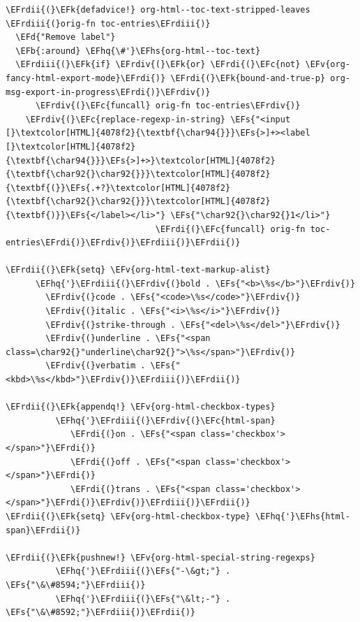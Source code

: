\documentclass{scrartcl}
\newcommand{\EFk}[1]{\textcolor{EFk}{#1}} %
\newcommand{\EFd}[1]{\textcolor{EFd}{\textit{#1}}} %
\newcommand{\EFs}[1]{\textcolor{EFs}{#1}} %
\newcommand{\EFb}[1]{\textcolor{EFb}{#1}} %
\newcommand{\EFc}[1]{\textcolor{EFc}{#1}} %
\newcommand{\EFv}[1]{\textcolor{EFv}{#1}} %
\newcommand{\EFhq}[1]{\textcolor{EFhq}{#1}} %
\newcommand{\EFhs}[1]{\textcolor{EFhs}{#1}} %
\newcommand{\EFrdi}[1]{\textcolor{EFrdi}{#1}} %
\newcommand{\EFrdii}[1]{\textcolor{EFrdii}{#1}} %
\newcommand{\EFrdiii}[1]{\textcolor{EFrdiii}{#1}} %
\newcommand{\EFrdiv}[1]{\textcolor{EFrdiv}{#1}} %
\begin{document}
\begin{Code}
\begin{Verbatim}[]
 \EFrdii{(}\EFk{defadvice!} org-html--toc-text-stripped-leaves \EFrdiii{(}orig-fn toc-entries\EFrdiii{)}
  \EFd{"Remove label"}
  \EFb{:around} \EFhq{\#'}\EFhs{org-html--toc-text}
  \EFrdiii{(}\EFk{if} \EFrdiv{(}\EFk{or} \EFrdi{(}\EFc{not} \EFv{org-fancy-html-export-mode}\EFrdi{)} \EFrdi{(}\EFk{bound-and-true-p} org-msg-export-in-progress\EFrdi{)}\EFrdiv{)}
      \EFrdiv{(}\EFc{funcall} orig-fn toc-entries\EFrdiv{)}
    \EFrdiv{(}\EFc{replace-regexp-in-string} \EFs{"<input [}\textcolor[HTML]{4078f2}{\textbf{\char94{}}}\EFs{>]+><label [}\textcolor[HTML]{4078f2}{\textbf{\char94{}}}\EFs{>]+>}\textcolor[HTML]{4078f2}{\textbf{\char92{}\char92{}}}\textcolor[HTML]{4078f2}{\textbf{(}}\EFs{.+?}\textcolor[HTML]{4078f2}{\textbf{\char92{}\char92{}}}\textcolor[HTML]{4078f2}{\textbf{)}}\EFs{</label></li>"} \EFs{"\char92{}\char92{}1</li>"}
                              \EFrdi{(}\EFc{funcall} orig-fn toc-entries\EFrdi{)}\EFrdiv{)}\EFrdiii{)}\EFrdii{)}

\EFrdii{(}\EFk{setq} \EFv{org-html-text-markup-alist}
      \EFhq{'}\EFrdiii{(}\EFrdiv{(}bold . \EFs{"<b>\%s</b>"}\EFrdiv{)}
        \EFrdiv{(}code . \EFs{"<code>\%s</code>"}\EFrdiv{)}
        \EFrdiv{(}italic . \EFs{"<i>\%s</i>"}\EFrdiv{)}
        \EFrdiv{(}strike-through . \EFs{"<del>\%s</del>"}\EFrdiv{)}
        \EFrdiv{(}underline . \EFs{"<span class=\char92{}"underline\char92{}">\%s</span>"}\EFrdiv{)}
        \EFrdiv{(}verbatim . \EFs{"<kbd>\%s</kbd>"}\EFrdiv{)}\EFrdiii{)}\EFrdii{)}

\EFrdii{(}\EFk{appendq!} \EFv{org-html-checkbox-types}
          \EFhq{'}\EFrdiii{(}\EFrdiv{(}\EFc{html-span}
             \EFrdi{(}on . \EFs{"<span class='checkbox'></span>"}\EFrdi{)}
             \EFrdi{(}off . \EFs{"<span class='checkbox'></span>"}\EFrdi{)}
             \EFrdi{(}trans . \EFs{"<span class='checkbox'></span>"}\EFrdi{)}\EFrdiv{)}\EFrdiii{)}\EFrdii{)}
\EFrdii{(}\EFk{setq} \EFv{org-html-checkbox-type} \EFhq{'}\EFhs{html-span}\EFrdii{)}

\EFrdii{(}\EFk{pushnew!} \EFv{org-html-special-string-regexps}
          \EFhq{'}\EFrdiii{(}\EFs{"-\&gt;"} . \EFs{"\&\#8594;"}\EFrdiii{)}
          \EFhq{'}\EFrdiii{(}\EFs{"\&lt;-"} . \EFs{"\&\#8592;"}\EFrdiii{)}\EFrdii{)}


\end{Verbatim}
\end{Code}
\end{document}
